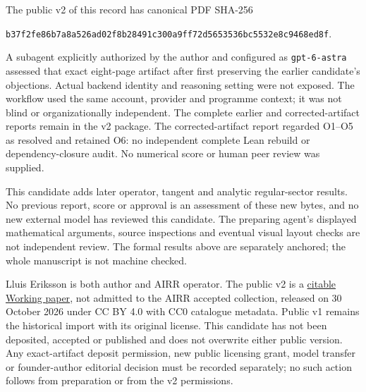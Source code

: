 \documentclass[11pt]{article}
\begin{document}
The public v2 of this record has canonical PDF SHA-256
\begin{center}\small\texttt{b37f2fe86b7a8a526ad02f8b28491c300a9ff72d5653536bc5532e8c9468ed8f}.\end{center}
A subagent explicitly authorized by the author and configured as
\texttt{gpt-6-astra} assessed that exact eight-page artifact after first
preserving the earlier candidate's objections. Actual backend identity and
reasoning setting were not exposed. The workflow used the same account,
provider and programme context; it was not blind or organizationally
independent. The complete earlier and corrected-artifact reports remain in
the v2 package. The corrected-artifact report regarded O1--O5 as resolved
and retained O6: no independent complete Lean rebuild or dependency-closure
audit. No numerical score or human peer review was supplied.

This candidate adds later operator, tangent and analytic regular-sector
results. No previous report, score or approval is an assessment of these new
bytes, and no new external model has reviewed this candidate. The preparing
agent's displayed mathematical arguments, source inspections and eventual
visual layout checks are not independent review. The formal results above
are separately anchored; the whole manuscript is not machine checked.

Lluis Eriksson is both author and AIRR operator. The public v2 is a
\href{https://airr.science/papers/ARR-2026-7EPM3V3DP796BBRR/versions/v2/}{citable Working paper},
not admitted to the AIRR accepted collection, released on 30 October 2026
under CC BY 4.0 with CC0 catalogue metadata. Public v1 remains the historical
import with its original license. This candidate has not been deposited,
accepted or published and does not overwrite either public version. Any
exact-artifact deposit permission, new public licensing grant, model transfer
or founder-author editorial decision must be recorded separately; no such
action follows from preparation or from the v2 permissions.
\end{document}
